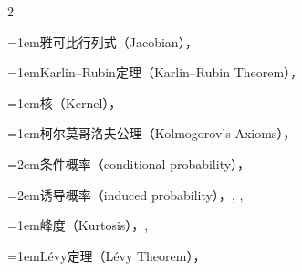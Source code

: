\begin{multicols}{2}
\par\noindent\hangindent=1em\hspace*{0em}\label{idx:593}雅可比行列式（Jacobian），\hyperref[idxocc:593:160]{\pageref*{idxocc:593:160}}\par
\par\addvspace{2pt}
\par\noindent\hangindent=1em\hspace*{0em}\label{idx:594}Karlin–Rubin定理（Karlin–Rubin Theorem），\hyperref[thm:8.3.17]{\pageref*{thm:8.3.17}}\par
\par\addvspace{2pt}
\par\noindent\hangindent=1em\hspace*{0em}\label{idx:595}核（Kernel），\hyperref[idxocc:595:83]{\pageref*{idxocc:595:83}}\par
\par\addvspace{2pt}
\par\noindent\hangindent=1em\hspace*{0em}\label{idx:596}柯尔莫哥洛夫公理（Kolmogorov’s Axioms），\hyperref[def:1.2.4]{\pageref*{def:1.2.4}}\par
\par\noindent\hangindent=2em\hspace*{1em}\label{idx:597}条件概率（conditional probability），\hyperref[idxocc:597:49]{\pageref*{idxocc:597:49}}\par
\par\noindent\hangindent=2em\hspace*{1em}\label{idx:598}诱导概率（induced probability），\hyperref[eq:1.4.1]{\pageref*{eq:1.4.1}}, \hyperref[idxocc:598:55]{\pageref*{idxocc:598:55}}, \hyperref[idxocc:598:70]{\pageref*{idxocc:598:70}}\par
\par\addvspace{2pt}
\par\noindent\hangindent=1em\hspace*{0em}\label{idx:599}峰度（Kurtosis），\hyperref[exercise:2.28]{\pageref*{exercise:2.28}}, \hyperref[exercise:7.45]{\pageref*{exercise:7.45}}\par
\par\addvspace{2pt}
\par\noindent\hangindent=1em\hspace*{0em}\label{idx:600}Lévy定理（Lévy Theorem），\hyperref[sec:5.8.1]{\pageref*{sec:5.8.1}}\par

\end{multicols}
